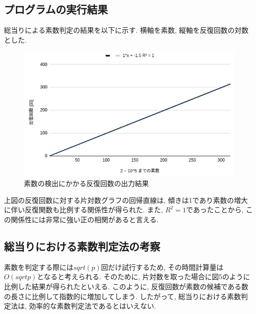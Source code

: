 \documentclass[xelatex, 11pt, a4paper, ja=standard]{bxjsarticle}
\begin{document}
\subsection{プログラムの実行結果}
総当りによる素数判定の結果を以下に示す. 
横軸を素数, 縦軸を反復回数の対数とした. 
\begin{figure}[htbp]
    \centering
    \includegraphics[height=0.5\textwidth,keepaspectratio]{./image/prime.png}
    \caption{素数の検出にかかる反復回数の出力結果}
    \label{fig:screenshot}
\end{figure}
\FloatBarrier %

上図の反復回数に対する片対数グラフの回帰直線は, 傾きは1であり素数の増大に伴い反復関数も比例する関係性が得られた. 
また, $R^2 = 1$であったことから, この関係性には非常に強い正の相関があると言える. 

\subsection{総当りにおける素数判定法の考察}
素数を判定する際には$sqrt(p)$回だけ試行するため, その時間計算量は$O(sqrt{p})$となると考えられる. 
そのために, 片対数を取った場合に図5のように比例した結果が得られたといえる. 
このように, 反復回数が素数の候補である数の長さに比例して指数的に増加してしまう. 
したがって, 総当りにおける素数判定法は, 効率的な素数判定法であるとはいえない. 
\end{document}
